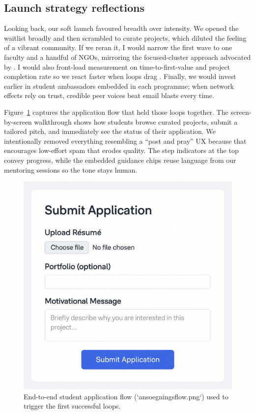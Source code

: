 \subsection*{Launch strategy reflections}
Looking back, our soft launch favoured breadth over intensity. We opened the waitlist broadly and then scrambled to curate projects, which diluted the feeling of a vibrant community. If we reran it, I would narrow the first wave to one faculty and a handful of NGOs, mirroring the focused-cluster approach advocated by \citet{Choudary2016}. I would also front-load measurement on time-to-first-value and project completion rate so we react faster when loops drag \citep{ShapiroVarian1999}. Finally, we would invest earlier in student ambassadors embedded in each programme; when network effects rely on trust, credible peer voices beat email blasts every time.

Figure~\ref{fig:application-flow} captures the application flow that held those loops together. The screen-by-screen walkthrough shows how students browse curated projects, submit a tailored pitch, and immediately see the status of their application. We intentionally removed everything resembling a ``post and pray'' UX because that encourages low-effort spam that erodes quality. The step indicators at the top convey progress, while the embedded guidance chips reuse language from our mentoring sessions so the tone stays human.

\begin{figure}[h]
  \centering
  \includegraphics[width=0.85\linewidth]{figures/opgave02/ansoegningsflow.png}
  \caption{End-to-end student application flow (`ansoegningsflow.png`) used to trigger the first successful loops.}
  \label{fig:application-flow}
\end{figure}

